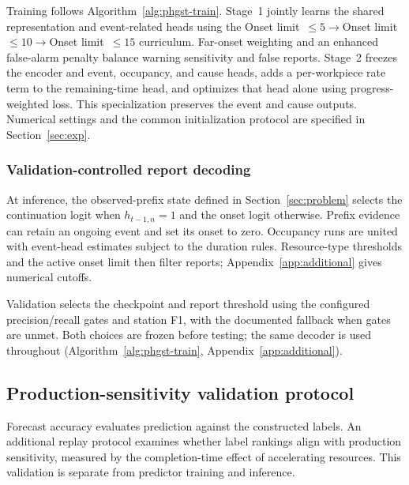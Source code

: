 \documentclass[a4paper,fleqn]{cas-dc}
\begin{document}
Training follows Algorithm~\ref{alg:phgst-train}. Stage~1 jointly learns the shared representation and event-related heads using the Onset limit~$\leq5\rightarrow$Onset limit~$\leq10\rightarrow$Onset limit~$\leq15$ curriculum. Far-onset weighting and an enhanced false-alarm penalty balance warning sensitivity and false reports. Stage~2 freezes the encoder and event, occupancy, and cause heads, adds a per-workpiece rate term to the remaining-time head, and optimizes that head alone using progress-weighted loss. This specialization preserves the event and cause outputs. Numerical settings and the common initialization protocol are specified in Section~\ref{sec:exp}.

\subsubsection{Validation-controlled report decoding}

At inference, the observed-prefix state defined in Section~\ref{sec:problem} selects the continuation logit when $h_{t-1,n}=1$ and the onset logit otherwise. Prefix evidence can retain an ongoing event and set its onset to zero. Occupancy runs are united with event-head estimates subject to the duration rules. Resource-type thresholds and the active onset limit then filter reports; Appendix~\ref{app:additional} gives numerical cutoffs.

Validation selects the checkpoint and report threshold using the configured precision/recall gates and station F1, with the documented fallback when gates are unmet. Both choices are frozen before testing; the same decoder is used throughout (Algorithm~\ref{alg:phgst-train}, Appendix~\ref{app:additional}).



\subsection{Production-sensitivity validation protocol}\label{sec:sensitivity-protocol}

Forecast accuracy evaluates prediction against the constructed labels. An additional replay protocol examines whether label rankings align with production sensitivity, measured by the completion-time effect of accelerating resources. This validation is separate from predictor training and inference.
\end{document}
